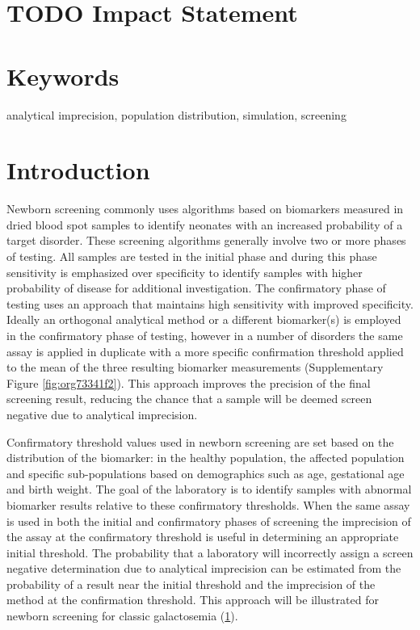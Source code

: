 \documentclass[review]{elsarticle}
\begin{document}
\section*{{\bfseries\sffamily TODO} Impact Statement}
\label{sec:orgb0da022}

\section*{Keywords}
\label{sec:org0940abb}
analytical imprecision, population distribution, simulation, screening

\section*{Introduction}
\label{sec:org7593b26}
Newborn screening commonly uses algorithms based on biomarkers
measured in dried blood spot samples to identify neonates with an
increased probability of a target disorder. These screening algorithms
generally involve two or more phases of testing. All samples are
tested in the initial phase and during this phase sensitivity is
emphasized over specificity to identify samples with higher
probability of disease for additional investigation. The confirmatory
phase of testing uses an approach that maintains high sensitivity
with improved specificity. Ideally an orthogonal analytical method or
a different biomarker(s) is employed in the confirmatory phase of
testing, however in a number of disorders the same assay is applied in
duplicate with a more specific confirmation threshold applied to the
mean of the three resulting biomarker measurements (Supplementary Figure
\ref{fig:org73341f2}). This approach improves the precision of the final
screening result, reducing the chance that a sample will be deemed
screen negative due to analytical imprecision.

Confirmatory threshold values used in newborn screening are set based
on the distribution of the biomarker: in the healthy population, the
affected population and specific sub-populations based on demographics
such as age, gestational age and birth weight. The goal of the
laboratory is to identify samples with abnormal biomarker results
relative to these confirmatory thresholds. When the same assay is used
in both the initial and confirmatory phases of screening the
imprecision of the assay at the confirmatory threshold is useful in
determining an appropriate initial threshold. The probability that a
laboratory will incorrectly assign a screen negative determination due
to analytical imprecision can be estimated from the probability of a
result near the initial threshold and the imprecision of the method at
the confirmation threshold. This approach will be illustrated for
newborn screening for classic galactosemia (\hyperlink{citeproc_bib_item_1}{1}).
\end{document}
